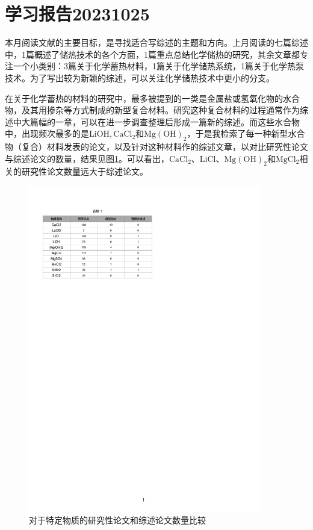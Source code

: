 \documentclass[oneside]{report}
\begin{document}
\chapter*{学习报告20231025}

本月阅读文献的主要目标，是寻找适合写综述的主题和方向。上月阅读的七篇综述中，1篇概述了储热技术的各个方面，1篇重点总结化学储热的研究，其余文章都专注一个小类别：3篇关于化学蓄热材料，1篇关于化学储热系统，1篇关于化学热泵技术。为了写出较为新颖的综述，可以关注化学储热技术中更小的分支。

在关于化学蓄热的材料的研究中，最多被提到的一类是金属盐或氢氧化物的水合物，及其用掺杂等方式制成的新型复合材料。研究这种复合材料的过程通常作为综述中大篇幅的一章，可以在进一步调查整理后形成一篇新的综述。而这些水合物中，出现频次最多的是$\mathrm{LiOH, CaCl_2}$和$\mathrm{Mg(OH)_2} $，于是我检索了每一种新型水合物（复合）材料发表的论文，以及针对这种材料作的综述文章，以对比研究性论文与综述论文的数量，结果见图\ref{tab:论文统计}。可以看出，$\mathrm{CaCl_2}$、$\mathrm{LiCl}$、$\mathrm{Mg(OH)_2}$和$\mathrm{MgCl_2}$相关的研究性论文数量远大于综述论文。

\begin{figure}[H]
    \centering
    \includegraphics[width=0.9\textwidth]{image/论文统计.pdf}
    \caption{对于特定物质的研究性论文和综述论文数量比较}
    \label{tab:论文统计}
\end{figure}
\end{document}
